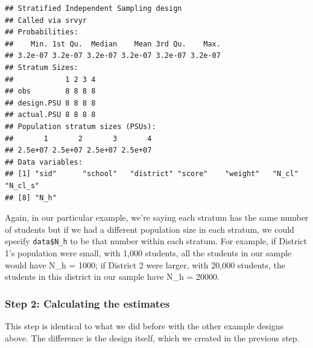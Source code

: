 \documentclass[
]{article}
\newenvironment{Shaded}{\begin{snugshade}}{\end{snugshade}}
\newcommand{\DataTypeTok}[1]{\textcolor[rgb]{0.13,0.29,0.53}{#1}}
\newcommand{\DecValTok}[1]{\textcolor[rgb]{0.00,0.00,0.81}{#1}}
\newcommand{\KeywordTok}[1]{\textcolor[rgb]{0.13,0.29,0.53}{\textbf{#1}}}
\newcommand{\NormalTok}[1]{#1}
\newcommand{\OperatorTok}[1]{\textcolor[rgb]{0.81,0.36,0.00}{\textbf{#1}}}
\newcommand{\OtherTok}[1]{\textcolor[rgb]{0.56,0.35,0.01}{#1}}
\newcommand{\StringTok}[1]{\textcolor[rgb]{0.31,0.60,0.02}{#1}}
\begin{document}
\begin{Shaded}
\end{Shaded}

\begin{verbatim}
## Stratified Independent Sampling design
## Called via srvyr
## Probabilities:
##    Min. 1st Qu.  Median    Mean 3rd Qu.    Max. 
## 3.2e-07 3.2e-07 3.2e-07 3.2e-07 3.2e-07 3.2e-07 
## Stratum Sizes: 
##            1 2 3 4
## obs        8 8 8 8
## design.PSU 8 8 8 8
## actual.PSU 8 8 8 8
## Population stratum sizes (PSUs): 
##       1       2       3       4 
## 2.5e+07 2.5e+07 2.5e+07 2.5e+07 
## Data variables:
## [1] "sid"      "school"   "district" "score"    "weight"   "N_cl"     "N_cl_s"  
## [8] "N_h"
\end{verbatim}

Again, in our particular example, we're saying each stratum has the same number of students but if we had a different population size in each stratum, we could specify \texttt{data\$N\_h} to be that number within each stratum. For example, if District 1's population were small, with 1,000 students, all the students in our sample would have N\_h = 1000; if District 2 were larger, with 20,000 students, the students in this district in our sample have N\_h = 20000.

\hypertarget{step-2-calculating-the-estimates-1}{%
\subsubsection{Step 2: Calculating the estimates}\label{step-2-calculating-the-estimates-1}}

This step is identical to what we did before with the other example designs above. The difference is the design itself, which we created in the previous step.

\begin{Shaded}
\end{Shaded}
\end{document}
